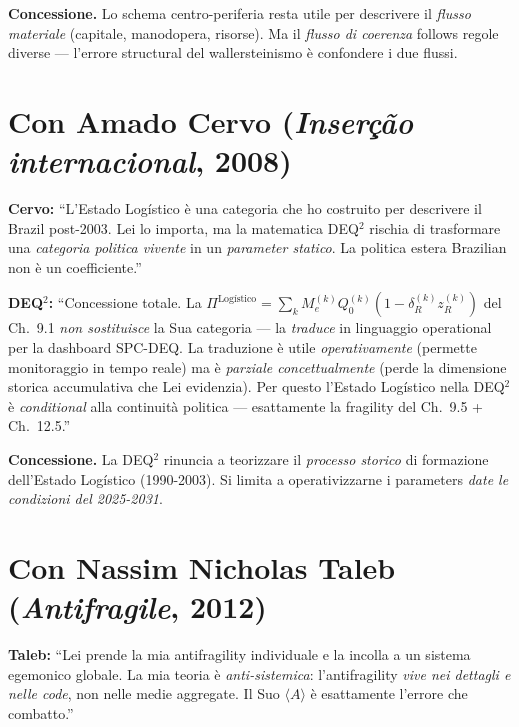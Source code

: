 \textbf{Concessione.} Lo schema centro-periferia resta utile per
descrivere il \emph{flusso materiale} (capitale, manodopera, risorse).
Ma il \emph{flusso di coerenza} follows regole diverse --- l'errore
structural del wallersteinismo è confondere i due flussi.



\section{\texorpdfstring{Con Amado Cervo (\emph{Inserção internacional},
2008)}{Con Amado Cervo (Inserção internacional, 2008)}}\label{con-amado-cervo-inseruxe7uxe3o-internacional-2008}

\textbf{Cervo:} ``L'Estado Logístico è una categoria che ho costruito
per descrivere il Brazil post-2003. Lei lo importa, ma la matematica
DEQ$^2$ rischia di trasformare una \emph{categoria politica vivente} in un
\emph{parameter statico}. La politica estera Brazilian non è un
coefficiente.''

\textbf{DEQ$^2$:} ``Concessione totale. La
\(\Pi^{\text{Logístico}} = \sum_k M_e^{(k)} Q_0^{(k)} (1 - \delta_R^{(k)} z_R^{(k)})\)
del Ch.~9.1 \emph{non sostituisce} la Sua categoria --- la
\emph{traduce} in linguaggio operational per la dashboard SPC-DEQ. La
traduzione è utile \emph{operativamente} (permette monitoraggio in tempo
reale) ma è \emph{parziale concettualmente} (perde la dimensione storica
accumulativa che Lei evidenzia). Per questo l'Estado Logístico nella
DEQ$^2$ è \emph{conditional} alla continuità politica --- esattamente la
fragility del Ch.~9.5 + Ch.~12.5.''

\textbf{Concessione.} La DEQ$^2$ rinuncia a teorizzare il \emph{processo
storico} di formazione dell'Estado Logístico (1990-2003). Si limita a
operativizzarne i parameters \emph{date le condizioni del 2025-2031}.



\section{\texorpdfstring{Con Nassim Nicholas Taleb (\emph{Antifragile},
2012)}{Con Nassim Nicholas Taleb (Antifragile, 2012)}}\label{con-nassim-nicholas-taleb-antifragile-2012}

\textbf{Taleb:} ``Lei prende la mia antifragility individuale e la
incolla a un sistema egemonico globale. La mia teoria è
\emph{anti-sistemica}: l'antifragility \emph{vive nei dettagli e nelle
code}, non nelle medie aggregate. Il Suo \(\langle A\rangle\) è
esattamente l'errore che combatto.''

